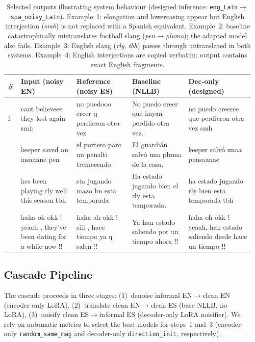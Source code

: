 \documentclass[11pt]{article}
\begin{document}
\begin{table}[t]
  \centering
  \small
  \setlength{\tabcolsep}{3pt}
  \begin{tabular}{p{0.6cm}p{4.2cm}p{3.5cm}p{3.8cm}p{3.8cm}}
    \toprule
    \textbf{\#} & \textbf{Input (noisy EN)} & \textbf{Reference (noisy ES)} &
      \textbf{Baseline (NLLB)} & \textbf{Dec-only (designed)} \\
    \midrule
    1 & cant believeee they lost again smh & no puedooo creer q perdieron otra vez &
      No puedo creer que hayan perdido otra vez. &
      no puedo creeree que perdieron otra vez smh \\
    \addlinespace
    2 & keeper saved an insaaane pen & el portero paro un penalti tremeeendo &
      El guardi\'an salv\'o una pluma de la casa. &
      keeper salv\'o unaa pensaaane \\
    \addlinespace
    3 & hes been playing rly well this season tbh & sta jugando mazo bn esta temporada &
      Ha estado jugando bien el rly esta temporada. &
      ha estado jugando rly bien esta temporada tbh \\
    \addlinespace
    4 & haha oh okk ! yeaah , they've been dating for a while now !! &
      haha ah okk ! siii , hace tiempo ya q salen !! &
      Ya han estado saliendo por un tiempo ahora !! &
      haha oh okk ! yeaah, han estado saliendo desde hace un tiempo !! \\
    \bottomrule
  \end{tabular}
  \caption{Selected outputs illustrating system behaviour (designed inference:
    \texttt{eng\_Latn}$\rightarrow$\texttt{spa\_noisy\_Latn}).
    Example~1: elongation and lowercasing appear but English interjection (\textit{smh}) is not replaced with a Spanish equivalent.
    Example~2: baseline catastrophically mistranslates football slang (\textit{pen}$\rightarrow$\textit{pluma}); the adapted model also fails.
    Example~3: English slang (\textit{rly}, \textit{tbh}) passes through untranslated in both systems.
    Example~4: English interjections are copied verbatim; output contains exact English fragments.}
  \label{tab:qualitative}
\end{table}


\subsection{Cascade Pipeline}
\label{sec:cascade}

The cascade proceeds in three stages:
(1)~denoise informal EN$\rightarrow$clean EN (encoder-only LoRA),
(2)~translate clean EN$\rightarrow$clean ES (base NLLB, no LoRA),
(3)~noisify clean ES$\rightarrow$informal ES (decoder-only LoRA noisifier).
We rely on automatic metrics to select the best models for steps~1 and~3 (encoder-only
\texttt{random\_same\_mag} and decoder-only \texttt{direction\_init},
respectively).
\end{document}
